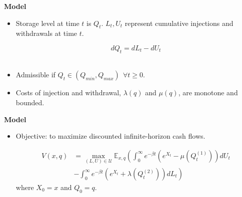 \documentclass{beamer}
\begin{document}
\begin{frame}
{\bf Model}
\begin{itemize}
\item Storage level at time $t$ is $Q_t$. $L_t,U_t$ represent cumulative injections and withdrawals at time $t$.

\begin{equation*}
  dQ_t = dL_t - dU_t
\end{equation*}
\\
\item Admissible if $Q_t \in (Q_{min},Q_{max})~~ \forall t \geq 0$.

\item Costs of injection and withdrawal, $\lambda(q)$ and $\mu(q)$, are monotone and bounded.

\end{itemize}

\end{frame}


\begin{frame}
{\bf Model}
\begin{itemize}
  \item Objective: to maximize discounted infinite-horizon cash flows.

  \begin{equation}
  \begin{split}
  V(x,q) &= \max_{(L,U) \in \mathcal{U}} \mathbb{E}_{x,q} \left(\int_{0}^{\infty} e^{-\beta t}(e^{X_t} - \mu(Q^{(1)}_t))dU_t\right.\\
  &\left.- \int_{0}^{\infty}e^{-\beta t}(e^{X_t} + \lambda(Q^{(2)}_t))dL_t\right)
  \end{split}
\end{equation}
where $X_0 =x$ and $Q_0 = q$. %
%
  
\end{itemize}
\end{frame}
\end{document}
